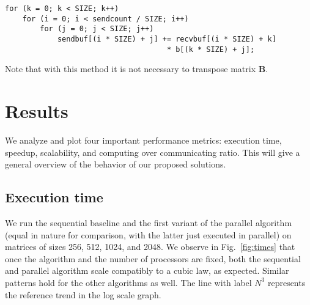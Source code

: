 \documentclass[11pt]{article}
\begin{document}
\begin{verbatim}
for (k = 0; k < SIZE; k++)
    for (i = 0; i < sendcount / SIZE; i++)
        for (j = 0; j < SIZE; j++)
            sendbuf[(i * SIZE) + j] += recvbuf[(i * SIZE) + k] 
                                     * b[(k * SIZE) + j];
\end{verbatim}
Note that with this method it is not necessary to transpose matrix $\mathbf{B}$. 

\newpage
\section{Results}
We analyze and plot four important performance metrics: execution time, speedup, scalability, and computing over communicating ratio. This will give a general overview of the behavior of our proposed solutions.

\subsection{Execution time}

We run the sequential baseline and the first variant of the parallel algorithm (equal in nature for comparison, with the latter just executed in parallel) on matrices of sizes 256, 512, 1024, and 2048. We observe in Fig.~\ref{fig:times} that once the algorithm and the number of processors are fixed, both the sequential and parallel algorithm scale compatibly to a cubic law, as expected. Similar patterns hold for the other algorithms as well. The line with label $N^3$ represents the reference trend in the log scale graph.
\end{document}
